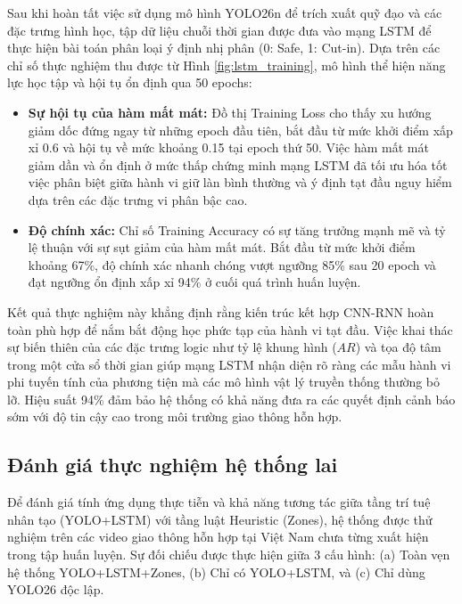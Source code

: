 Sau khi hoàn tất việc sử dụng mô hình YOLO26n để trích xuất quỹ đạo và các đặc trưng hình học, tập dữ liệu chuỗi thời gian được đưa vào mạng LSTM để thực hiện bài toán phân loại ý định nhị phân (0: Safe, 1: Cut-in). Dựa trên các chỉ số thực nghiệm thu được từ Hình \ref{fig:lstm_training}, mô hình thể hiện năng lực học tập và hội tụ ổn định qua 50 epochs:

\begin{itemize}
    \item \textbf{Sự hội tụ của hàm mất mát:} Đồ thị Training Loss cho thấy xu hướng giảm dốc đứng ngay từ những epoch đầu tiên, bắt đầu từ mức khởi điểm xấp xỉ 0.6 và hội tụ về mức khoảng 0.15 tại epoch thứ 50. Việc hàm mất mát giảm dần và ổn định ở mức thấp chứng minh mạng LSTM đã tối ưu hóa tốt việc phân biệt giữa hành vi giữ làn bình thường và ý định tạt đầu nguy hiểm dựa trên các đặc trưng vi phân bậc cao.
    
    \item \textbf{Độ chính xác:} Chỉ số Training Accuracy có sự tăng trưởng mạnh mẽ và tỷ lệ thuận với sự sụt giảm của hàm mất mát. Bắt đầu từ mức khởi điểm khoảng 67\%, độ chính xác nhanh chóng vượt ngưỡng 85\% sau 20 epoch và đạt ngưỡng ổn định xấp xỉ 94\% ở cuối quá trình huấn luyện. 
\end{itemize}

Kết quả thực nghiệm này khẳng định rằng kiến trúc kết hợp CNN-RNN hoàn toàn phù hợp để nắm bắt động học phức tạp của hành vi tạt đầu. Việc khai thác sự biến thiên của các đặc trưng logic như tỷ lệ khung hình ($AR$) và tọa độ tâm trong một cửa sổ thời gian giúp mạng LSTM nhận diện rõ ràng các mẫu hành vi phi tuyến tính của phương tiện mà các mô hình vật lý truyền thống thường bỏ lỡ. Hiệu suất 94\% đảm bảo hệ thống có khả năng đưa ra các quyết định cảnh báo sớm với độ tin cậy cao trong môi trường giao thông hỗn hợp.


\subsection{Đánh giá thực nghiệm hệ thống lai}
Để đánh giá tính ứng dụng thực tiễn và khả năng tương tác giữa tầng trí tuệ nhân tạo (YOLO+LSTM) với tầng luật Heuristic (Zones), hệ thống được thử nghiệm trên các video giao thông hỗn hợp tại Việt Nam chưa từng xuất hiện trong tập huấn luyện. Sự đối chiếu được thực hiện giữa 3 cấu hình: (a) Toàn vẹn hệ thống YOLO+LSTM+Zones, (b) Chỉ có YOLO+LSTM, và (c) Chỉ dùng YOLO26 độc lập.

